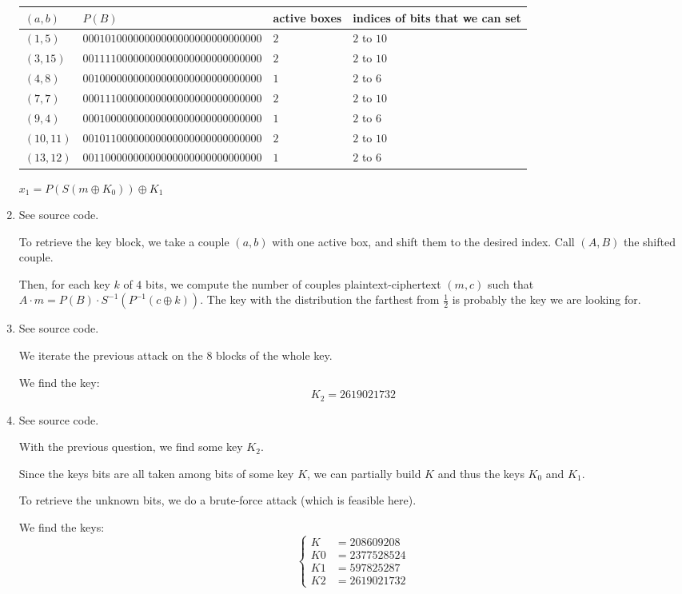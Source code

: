 \begin{enumerate}[label=\textbf{\arabic*})]
    \begin{tabular}{llll}
        $(a, b)$ & $P(B)$ & active boxes & indices of bits that we can set \\
        \hline
        $(1, 5)$    & $00010100000000000000000000000000$ & $2$ & $2$ to $10$\\
        $(3, 15)$   & $00111100000000000000000000000000$ & $2$ & $2$ to $10$\\
        $(4, 8)$    & $00100000000000000000000000000000$ & $1$ & $2$ to $6$\\
        $(7, 7)$    & $00011100000000000000000000000000$ & $2$ & $2$ to $10$\\
        $(9, 4)$    & $00010000000000000000000000000000$ & $1$ & $2$ to $6$\\
        $(10, 11)$  & $00101100000000000000000000000000$ & $2$ & $2$ to $10$\\
        $(13, 12)$  & $00110000000000000000000000000000$ & $1$ & $2$ to $6$\\
    \end{tabular}

    $x_1 = P(S(m \oplus K_0))\oplus K_1$

    \item See source code.

    To retrieve the key block, we take a couple $(a, b)$ with one active box, and shift them
    to the desired index. Call $(A, B)$ the shifted couple.

    Then, for each key $k$ of $4$ bits, we compute the number of couples
    plaintext-ciphertext $(m, c)$ such that
    $A\cdot m = P(B) \cdot S^{-1}(P^{-1}(c\oplus k))$.
    The key with the distribution the farthest from $\frac{1}{2}$ is probably the
    key we are looking for.

    \item See source code.

    We iterate the previous attack on the $8$ blocks of the whole key.

    We find the key:
    \[K_2 = 2619021732\]

    \item See source code.

    With the previous question, we find some key $K_2$.

    Since the keys bits are all taken among bits of some key $K$, we can partially
    build $K$ and thus the keys $K_0$ and $K_1$.

    To retrieve the unknown bits, we do a brute-force attack (which is feasible here).

    We find the keys:
    \[\begin{cases}
        K  &= 208609208\\
        K0 &= 2377528524\\
        K1 &= 597825287\\
        K2 &= 2619021732
    \end{cases}\]
\end{enumerate}


